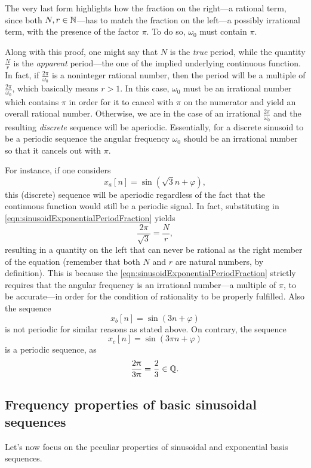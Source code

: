 \documentclass[\documentfontsize, twocolumn]{\classname}
\begin{document}
The very last form highlights how the fraction on the right---a rational term, since both $N,r \in \mathbb N$---has to match the fraction on the left---a possibly irrational term, with the presence of the factor $\pi$. To do so, $\omega_0$ must contain $\pi$.

Along with this proof, one might say that $N$ is the \emph{true} period, while the quantity $\frac{N}{r}$ is the \emph{apparent} period---the one of the implied underlying continuous function.
In fact, if $\frac{2\pi}{\omega_0}$ is a noninteger rational number, then the period will be a multiple of $\frac{2\pi}{\omega_0}$, which basically means $r > 1$.
In this case, $\omega_0$ must be an irrational number which contains $\pi$ in order for it to cancel with $\pi$ on the numerator and yield an overall rational number.
Otherwise, we are in the case of an irrational $\frac{2\pi}{\omega_0}$ and the resulting \emph{discrete} se\-quen\-ce will be aperiodic.
Essentially, for a discrete sinusoid to be a periodic sequence the angular frequency $\omega_0$ should be an irrational number so that it cancels out with $\pi$.

For instance, if one considers \[x_a[n] = \sin{(\sqrt{3}n + \varphi)},\] this (discrete) se\-quen\-ce will be aperiodic regardless of the fact that the continuous function would still be a periodic signal. In fact, substituting in \ref{eqn:sinusoidExponentialPeriodFraction} yields \[\frac{2\pi}{\sqrt{3}} = \frac N r,\] resulting in a quantity on the left that can never be rational as the right member of the equation (remember that both $N$ and $r$ are natural numbers, by definition). This is because the \ref{eqn:sinusoidExponentialPeriodFraction} strictly requires that the angular frequency is an irrational number---a multiple of $\pi$, to be accurate---in order for the condition of rationality to be properly fulfilled. Also the sequence \[x_b[n] = \sin{(3n + \varphi)}\] is not periodic for similar reasons as stated above. On contrary, the sequence \[x_c[n] = \sin{(3\pi n + \varphi)}\] is a periodic sequence, as \[\frac{2\uppi}{3\uppi} = \frac 2 3 \in \mathbb Q.\]

\subsection{Frequency properties of basic sinusoidal se\-quen\-ces}

Let's now focus on the peculiar properties of sinusoidal and exponential basis se\-quen\-ces.
\end{document}
